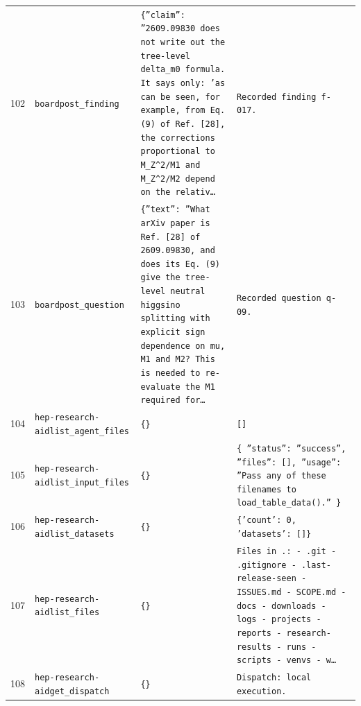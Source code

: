 \documentclass[11pt,a4paper]{article}
\begin{document}
\begin{longtable}{@{}p{}p{}p{}p{}@{}}
102 & \texttt{board}\newline\texttt{post\_\allowbreak{}finding} & \texttt{\{''claim'':\allowbreak{} ''2609.09830 does not write out the tree-level delta\_\allowbreak{}m0 formula. It says only:\allowbreak{} 'as can be seen,\allowbreak{} for example,\allowbreak{} from Eq. (9)\allowbreak{} of Ref. [28]\allowbreak{},\allowbreak{} the corrections proportional to M\_\allowbreak{}Z\textasciicircum{}\allowbreak{}2/\allowbreak{}M1 and M\_\allowbreak{}Z\textasciicircum{}\allowbreak{}2/\allowbreak{}M2 depend on the relativ\ldots{}\allowbreak{}} & \texttt{Recorded finding f-017.} \\
103 & \texttt{board}\newline\texttt{post\_\allowbreak{}question} & \texttt{\{''text'':\allowbreak{} ''What arXiv paper is Ref. [28]\allowbreak{} of 2609.09830,\allowbreak{} and does its Eq. (9)\allowbreak{} give the tree-level neutral higgsino splitting with explicit sign dependence on mu,\allowbreak{} M1 and M2? This is needed to re-evaluate the M1 required for\ldots{}\allowbreak{}} & \texttt{Recorded question q-09.} \\
104 & \texttt{hep-research-aid}\newline\texttt{list\_\allowbreak{}agent\_\allowbreak{}files} & \texttt{\{\}\allowbreak{}} & \texttt{[]\allowbreak{}} \\
105 & \texttt{hep-research-aid}\newline\texttt{list\_\allowbreak{}input\_\allowbreak{}files} & \texttt{\{\}\allowbreak{}} & \texttt{\{   ''status'':\allowbreak{} ''success'',\allowbreak{}   ''files'':\allowbreak{} []\allowbreak{},\allowbreak{}   ''usage'':\allowbreak{} ''Pass any of these filenames to load\_\allowbreak{}table\_\allowbreak{}data()\allowbreak{}.'' \}\allowbreak{}} \\
106 & \texttt{hep-research-aid}\newline\texttt{list\_\allowbreak{}datasets} & \texttt{\{\}\allowbreak{}} & \texttt{\{'count':\allowbreak{} 0,\allowbreak{} 'datasets':\allowbreak{} []\allowbreak{}\}\allowbreak{}} \\
107 & \texttt{hep-research-aid}\newline\texttt{list\_\allowbreak{}files} & \texttt{\{\}\allowbreak{}} & \texttt{Files in .:\allowbreak{}   - .git   - .gitignore   - .last-release-seen   - ISSUES.md   - SCOPE.md   - docs   - downloads   - logs   - projects   - reports   - research-results   - runs   - scripts   - venvs   - w\ldots{}\allowbreak{}} \\
108 & \texttt{hep-research-aid}\newline\texttt{get\_\allowbreak{}dispatch} & \texttt{\{\}\allowbreak{}} & \texttt{Dispatch:\allowbreak{} local execution.} \\

\end{longtable}
\end{document}
